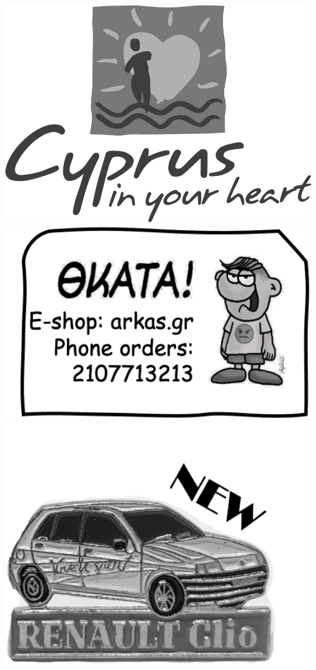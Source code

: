 \begin{columns}[T]
  \begin{column}{0.15\textwidth}
    \vspace{0.2cm}
    \includegraphics[width=1.0\textwidth]{./figures/Cyprus-in-your-heart.png}
    \vspace{0.2cm}
    \includegraphics[width=1.0\textwidth]{./figures/thkata.png}
    \vspace{-0.5cm}
    \includegraphics[width=1.0\textwidth]{./figures/car.png}
  \end{column}
  \end{columns}


